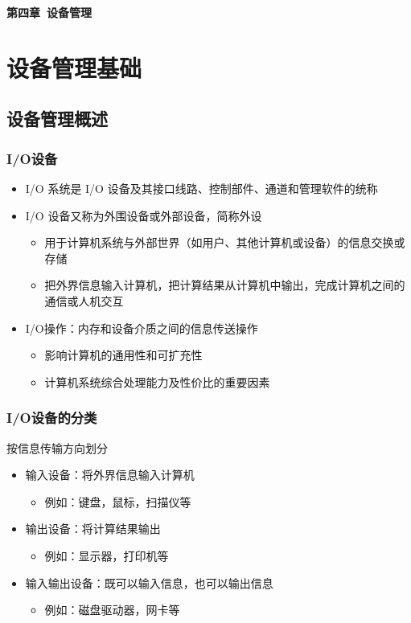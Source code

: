 \documentclass[cs4size,a4paper,10pt]{ctexart}
\begin{document}
	\begin{center}
		{\huge\textbf{第四章\ 设备管理}}
	\end{center}
	\tableofcontents
	\clearpage

	\setcounter{page}{1}
	\setlength{\parskip}{0.65em}
	
	\section{设备管理基础}
	\subsection{设备管理概述}

	\subsubsection{I/O设备}
	\begin{itemize}
		\item I/O 系统是 I/O 设备及其接口线路、控制部件、通道和管理软件的统称
		\item I/O 设备又称为外围设备或外部设备，简称外设
		\begin{itemize}
			\item 用于计算机系统与外部世界（如用户、其他计算机或设备）的信息交换或存储
			\item 把外界信息输入计算机，把计算结果从计算机中输出，完成计算机之间的通信或人机交互
		\end{itemize}
		\item I/O操作：内存和设备介质之间的信息传送操作
		\begin{itemize}
			\item 影响计算机的通用性和可扩充性
			\item 计算机系统综合处理能力及性价比的重要因素
		\end{itemize}
	\end{itemize}


	\subsubsection{I/O设备的分类}
	按信息传输方向划分
	\begin{itemize}
		\item 输入设备：将外界信息输入计算机
		\begin{itemize}
			\item 例如：键盘，鼠标，扫描仪等
		\end{itemize}
		\item 输出设备：将计算结果输出
		\begin{itemize}
			\item 例如：显示器，打印机等
		\end{itemize}
		\item 输入输出设备：既可以输入信息，也可以输出信息
		\begin{itemize}
			\item 例如：磁盘驱动器，网卡等
		\end{itemize}
	\end{itemize}
	
\end{document}
